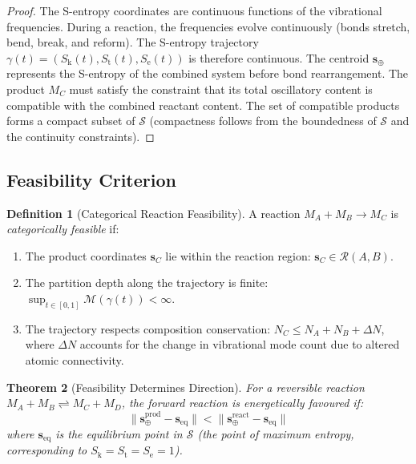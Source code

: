 \documentclass[11pt,twocolumn,a4paper]{article}
\newtheorem{theorem}{Theorem}[section]
\theoremstyle{definition}
\newtheorem{definition}[theorem]{Definition}
\theoremstyle{remark}
\newcommand{\Sk}{S_{\mathrm{k}}}
\newcommand{\St}{S_{\mathrm{t}}}
\newcommand{\Se}{S_{\mathrm{e}}}
\newcommand{\Sspace}{\mathcal{S}}
\newcommand{\Depth}{\mathcal{M}}
\begin{document}
\begin{proof}
The S-entropy coordinates are continuous functions of the vibrational frequencies. During a reaction, the frequencies evolve continuously (bonds stretch, bend, break, and reform). The S-entropy trajectory $\gamma(t) = (\Sk(t), \St(t), \Se(t))$ is therefore continuous. The centroid $\mathbf{s}_{\oplus}$ represents the S-entropy of the combined system before bond rearrangement. The product $M_C$ must satisfy the constraint that its total oscillatory content is compatible with the combined reactant content. The set of compatible products forms a compact subset of $\Sspace$ (compactness follows from the boundedness of $\Sspace$ and the continuity constraints).
\end{proof}

\subsection{Feasibility Criterion}

\begin{definition}[Categorical Reaction Feasibility]
\label{def:feasibility}
A reaction $M_A + M_B \to M_C$ is \emph{categorically feasible} if:
\begin{enumerate}[nosep]
\item The product coordinates $\mathbf{s}_C$ lie within the reaction region: $\mathbf{s}_C \in \mathcal{R}(A, B)$.
\item The partition depth along the trajectory is finite: $\sup_{t \in [0,1]} \Depth(\gamma(t)) < \infty$.
\item The trajectory respects composition conservation: $N_C \leq N_A + N_B + \Delta N$, where $\Delta N$ accounts for the change in vibrational mode count due to altered atomic connectivity.
\end{enumerate}
\end{definition}

\begin{theorem}[Feasibility Determines Direction]
\label{thm:direction}
For a reversible reaction $M_A + M_B \rightleftharpoons M_C + M_D$, the forward reaction is energetically favoured if:
\begin{equation}
\|\mathbf{s}_{\oplus}^{\mathrm{prod}} - \mathbf{s}_{\mathrm{eq}}\| < \|\mathbf{s}_{\oplus}^{\mathrm{react}} - \mathbf{s}_{\mathrm{eq}}\|
\label{eq:direction}
\end{equation}
where $\mathbf{s}_{\mathrm{eq}}$ is the equilibrium point in $\Sspace$ (the point of maximum entropy, corresponding to $\Sk = \St = \Se = 1$).
\end{theorem}
\end{document}
